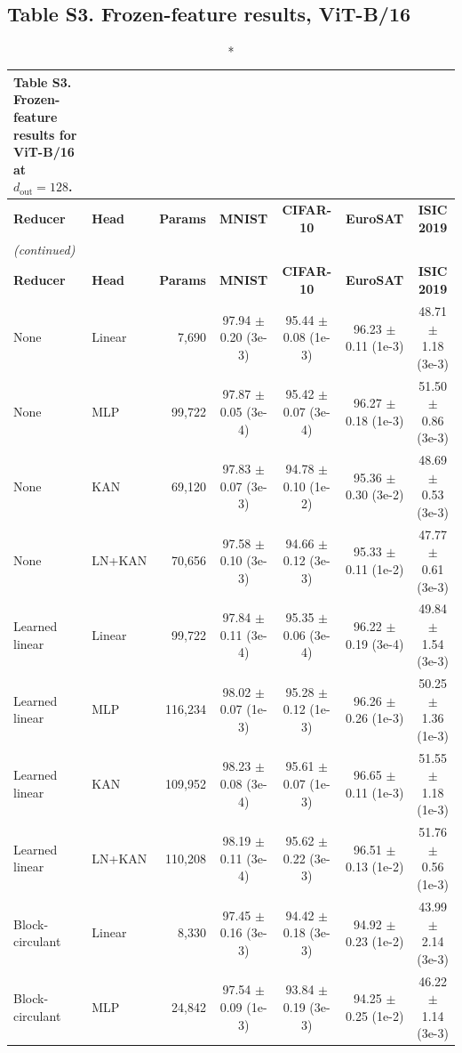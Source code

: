 \documentclass[10pt]{article}
\begin{document}
\subsection*{Table S3. Frozen-feature results, ViT-B/16}
\scriptsize
\setlength{\tabcolsep}{3pt}
\begin{longtable}{llrcccc}
\caption*{\textbf{Table S3.} Frozen-feature results for ViT-B/16 at $d_{\mathrm{out}}=128$.}\\
\toprule
\textbf{Reducer} & \textbf{Head} & \textbf{Params} & \textbf{MNIST} & \textbf{CIFAR-10} & \textbf{EuroSAT} & \textbf{ISIC 2019} \\
\midrule
\endfirsthead
\multicolumn{7}{l}{\textit{(continued)}}\\
\toprule
\textbf{Reducer} & \textbf{Head} & \textbf{Params} & \textbf{MNIST} & \textbf{CIFAR-10} & \textbf{EuroSAT} & \textbf{ISIC 2019} \\
\midrule
\endhead
\bottomrule
\endfoot
None & Linear & 7,690 & 97.94 $\pm$ 0.20 (3e-3) & 95.44 $\pm$ 0.08 (1e-3) & 96.23 $\pm$ 0.11 (1e-3) & 48.71 $\pm$ 1.18 (3e-3) \\
None & MLP & 99,722 & 97.87 $\pm$ 0.05 (3e-4) & 95.42 $\pm$ 0.07 (3e-4) & 96.27 $\pm$ 0.18 (1e-3) & 51.50 $\pm$ 0.86 (3e-3) \\
None & KAN & 69,120 & 97.83 $\pm$ 0.07 (3e-3) & 94.78 $\pm$ 0.10 (1e-2) & 95.36 $\pm$ 0.30 (3e-2) & 48.69 $\pm$ 0.53 (3e-3) \\
None & LN+KAN & 70,656 & 97.58 $\pm$ 0.10 (3e-3) & 94.66 $\pm$ 0.12 (3e-3) & 95.33 $\pm$ 0.11 (1e-2) & 47.77 $\pm$ 0.61 (3e-3) \\
\midrule
Learned linear & Linear & 99,722 & 97.84 $\pm$ 0.11 (3e-4) & 95.35 $\pm$ 0.06 (3e-4) & 96.22 $\pm$ 0.19 (3e-4) & 49.84 $\pm$ 1.54 (3e-3) \\
Learned linear & MLP & 116,234 & 98.02 $\pm$ 0.07 (1e-3) & 95.28 $\pm$ 0.12 (1e-3) & 96.26 $\pm$ 0.26 (1e-3) & 50.25 $\pm$ 1.36 (1e-3) \\
Learned linear & KAN & 109,952 & 98.23 $\pm$ 0.08 (3e-4) & 95.61 $\pm$ 0.07 (1e-3) & 96.65 $\pm$ 0.11 (1e-3) & 51.55 $\pm$ 1.18 (1e-3) \\
Learned linear & LN+KAN & 110,208 & 98.19 $\pm$ 0.11 (3e-4) & 95.62 $\pm$ 0.22 (3e-3) & 96.51 $\pm$ 0.13 (1e-2) & 51.76 $\pm$ 0.56 (1e-3) \\
\midrule
Block-circulant & Linear & 8,330 & 97.45 $\pm$ 0.16 (3e-3) & 94.42 $\pm$ 0.18 (3e-3) & 94.92 $\pm$ 0.23 (1e-2) & 43.99 $\pm$ 2.14 (3e-3) \\
Block-circulant & MLP & 24,842 & 97.54 $\pm$ 0.09 (1e-3) & 93.84 $\pm$ 0.19 (3e-3) & 94.25 $\pm$ 0.25 (1e-2) & 46.22 $\pm$ 1.14 (3e-3) \\

\end{longtable}
\end{document}
